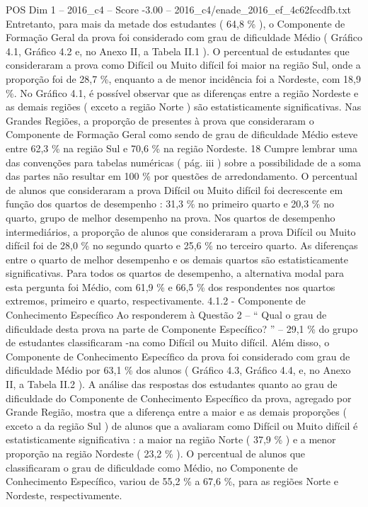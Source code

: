 \begin{textsample}{POS Dim 1 – 2016\_c4 – Score -3.00 – 2016\_c4/enade\_2016\_ef\_4c62fccdfb.txt}
Entretanto, para mais da metade dos estudantes ( 64,8 \% ), o Componente de Formação Geral da prova foi considerado com grau de dificuldade Médio ( Gráfico 4.1, Gráfico 4.2 e, no Anexo II, a Tabela II.1 ).
O percentual de estudantes que consideraram a prova como Difícil ou Muito difícil foi maior na região Sul, onde a proporção foi de 28,7 \%, enquanto a de menor incidência foi a Nordeste, com 18,9 \%.
No Gráfico 4.1, é possível observar que as diferenças entre a região Nordeste e as demais regiões ( exceto a região Norte ) são estatisticamente significativas.
Nas Grandes Regiões, a proporção de presentes à prova que consideraram o Componente de Formação Geral como sendo de grau de dificuldade Médio esteve entre 62,3 \% na região Sul e 70,6 \% na região Nordeste. 18 Cumpre lembrar uma das convenções para tabelas numéricas ( pág. iii ) sobre a possibilidade de a soma das partes não resultar em 100 \% por questões de arredondamento.
O percentual de alunos que consideraram a prova Difícil ou Muito difícil foi decrescente em função dos quartos de desempenho : 31,3 \% no primeiro quarto e 20,3 \% no quarto, grupo de melhor desempenho na prova.
Nos quartos de desempenho intermediários, a proporção de alunos que consideraram a prova Difícil ou Muito difícil foi de 28,0 \% no segundo quarto e 25,6 \% no terceiro quarto.
As diferenças entre o quarto de melhor desempenho e os demais quartos são estatisticamente significativas.
Para todos os quartos de desempenho, a alternativa modal para esta pergunta foi Médio, com 61,9 \% e 66,5 \% dos respondentes nos quartos extremos, primeiro e quarto, respectivamente. 4.1.2 - Componente de Conhecimento Específico Ao responderem à Questão 2 – “ Qual o grau de dificuldade desta prova na parte de Componente Específico? ” – 29,1 \% do grupo de estudantes classificaram -na como Difícil ou Muito difícil.
Além disso, o Componente de Conhecimento Específico da prova foi considerado com grau de dificuldade Médio por 63,1 \% dos alunos ( Gráfico 4.3, Gráfico 4.4, e, no Anexo II, a Tabela II.2 ).
A análise das respostas dos estudantes quanto ao grau de dificuldade do Componente de Conhecimento Específico da prova, agregado por Grande Região, mostra que a diferença entre a maior e as demais proporções ( exceto a da região Sul ) de alunos que a avaliaram como Difícil ou Muito difícil é estatisticamente significativa : a maior na região Norte ( 37,9 \% ) e a menor proporção na região Nordeste ( 23,2 \% ).
O percentual de alunos que classificaram o grau de dificuldade como Médio, no Componente de Conhecimento Específico, variou de 55,2 \% a 67,6 \%, para as regiões Norte e Nordeste, respectivamente.

\end{textsample}
